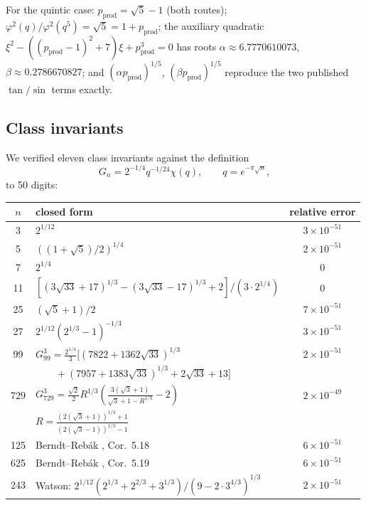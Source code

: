 \documentclass[11pt]{amsart}
\theoremstyle{plain}
\theoremstyle{definition}
\theoremstyle{remark}
\newcommand{\pprod}{p_{\mathrm{prod}}}
\begin{document}
For the quintic case: $\pprod = \sqrt{5}-1$ (both routes); $\varphi^2(q)/\varphi^2(q^5)
= \sqrt{5} = 1+\pprod$; the auxiliary quadratic $\xi^2-((\pprod-1)^2+7)\xi+\pprod^3=0$
has roots $\alpha \approx 6.7770610073$, $\beta \approx 0.2786670827$; and
$(\alpha\pprod)^{1/5}$, $(\beta\pprod)^{1/5}$ reproduce the two published
$\tan/\sin$ terms exactly.

\subsection{Class invariants}

We verified eleven class invariants against the definition
\begin{equation}
G_n = 2^{-1/4}q^{-1/24}\chi(q), \qquad q = e^{-\pi\sqrt{n}},
\end{equation}
to 50 digits:

\begin{center}
\small
\begin{tabular}{c|l|c}
$n$ & closed form & relative error \\ \hline
3 & $2^{1/12}$ & $3\times 10^{-51}$ \\
5 & $((1+\sqrt5)/2)^{1/4}$ & $2\times 10^{-51}$ \\
7 & $2^{1/4}$ & $0$ \\
11 & $[(3\sqrt{33}+17)^{1/3}-(3\sqrt{33}-17)^{1/3}+2]/(3\cdot 2^{1/4})$ & $0$ \\
25 & $(\sqrt5+1)/2$ & $7\times 10^{-51}$ \\
27 & $2^{1/12}(2^{1/3}-1)^{-1/3}$ & $3\times 10^{-51}$ \\
99 & $G_{99}^3 = \frac{2^{1/4}}{3}[(7822+1362\sqrt{33})^{1/3}$ & $2\times 10^{-51}$ \\
   & $\qquad +(7957+1383\sqrt{33})^{1/3}+2\sqrt{33}+13]$ & \\
729 & $G_{729}^3 = \frac{\sqrt2}{2}R^{1/3}
\left(\frac{3(\sqrt3+1)}{\sqrt3+1-R^{1/3}}-2\right)$ & $2\times 10^{-49}$ \\
   & $R = \frac{(2(\sqrt3+1))^{1/3}+1}{(2(\sqrt3-1))^{1/3}-1}$ & \\
125 & Berndt--Reb\'ak \cite{BR25}, Cor.~5.18 & $6\times 10^{-51}$ \\
625 & Berndt--Reb\'ak \cite{BR25}, Cor.~5.19 & $6\times 10^{-51}$ \\
243 & Watson: $2^{1/12}(2^{1/3}+2^{2/3}+3^{1/3})/(9-2\cdot 3^{4/3})^{1/3}$
& $2\times 10^{-51}$
\end{tabular}
\end{center}
\end{document}
